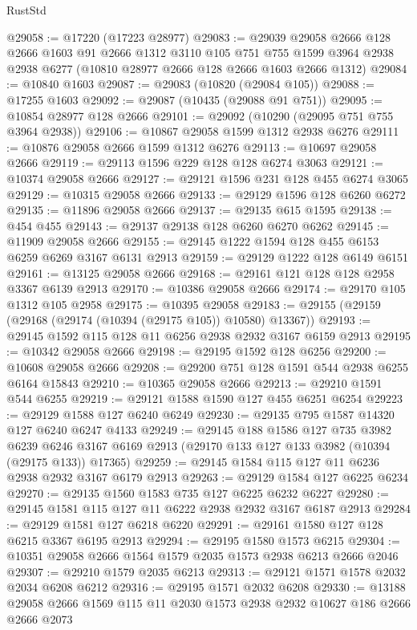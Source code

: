 \begin{lexlean}{RustStd}
\begin{coremodule}
@29058 := @17220 (@17223 @28977)
@29083 := @29039
    @29058
    @2666
    @128
    @2666
    @1603
    @91
    @2666
    @1312
    @3110
    @105
    @751
    @755
    @1599
    @3964
    @2938
    @2938
    @6277
    (@10810 @28977 @2666 @128 @2666 @1603 @2666 @1312)
@29084 := @10840 @1603
@29087 := @29083 (@10820 (@29084 @105))
@29088 := @17255 @1603
@29092 := @29087 (@10435 (@29088 @91 @751))
@29095 := @10854 @28977 @128 @2666
@29101 := @29092 (@10290 (@29095 @751 @755 @3964 @2938))
@29106 := @10867 @29058 @1599 @1312 @2938 @6276
@29111 := @10876 @29058 @2666 @1599 @1312 @6276
@29113 := @10697 @29058 @2666
@29119 := @29113 @1596 @229 @128 @128 @6274 @3063
@29121 := @10374 @29058 @2666
@29127 := @29121 @1596 @231 @128 @455 @6274 @3065
@29129 := @10315 @29058 @2666
@29133 := @29129 @1596 @128 @6260 @6272
@29135 := @11896 @29058 @2666
@29137 := @29135 @615 @1595
@29138 := @454 @455
@29143 := @29137 @29138 @128 @6260 @6270 @6262
@29145 := @11909 @29058 @2666
@29155 := @29145 @1222 @1594 @128 @455 @6153 @6259 @6269 @3167 @6131 @2913
@29159 := @29129 @1222 @128 @6149 @6151
@29161 := @13125 @29058 @2666
@29168 := @29161 @121 @128 @128 @2958 @3367 @6139 @2913
@29170 := @10386 @29058 @2666
@29174 := @29170 @105 @1312 @105 @2958
@29175 := @10395 @29058
@29183 := @29155 (@29159 (@29168 (@29174 (@10394 (@29175 @105)) @10580) @13367))
@29193 := @29145 @1592 @115 @128 @11 @6256 @2938 @2932 @3167 @6159 @2913
@29195 := @10342 @29058 @2666
@29198 := @29195 @1592 @128 @6256
@29200 := @10608 @29058 @2666
@29208 := @29200 @751 @128 @1591 @544 @2938 @6255 @6164 @15843
@29210 := @10365 @29058 @2666
@29213 := @29210 @1591 @544 @6255
@29219 := @29121 @1588 @1590 @127 @455 @6251 @6254
@29223 := @29129 @1588 @127 @6240 @6249
@29230 := @29135 @795 @1587 @14320 @127 @6240 @6247 @4133
@29249 := @29145
    @188
    @1586
    @127
    @735
    @3982
    @6239
    @6246
    @3167
    @6169
    @2913
    (@29170 @133 @127 @133 @3982 (@10394 (@29175 @133)) @17365)
@29259 := @29145 @1584 @115 @127 @11 @6236 @2938 @2932 @3167 @6179 @2913
@29263 := @29129 @1584 @127 @6225 @6234
@29270 := @29135 @1560 @1583 @735 @127 @6225 @6232 @6227
@29280 := @29145 @1581 @115 @127 @11 @6222 @2938 @2932 @3167 @6187 @2913
@29284 := @29129 @1581 @127 @6218 @6220
@29291 := @29161 @1580 @127 @128 @6215 @3367 @6195 @2913
@29294 := @29195 @1580 @1573 @6215
@29304 := @10351 @29058 @2666 @1564 @1579 @2035 @1573 @2938 @6213 @2666 @2046
@29307 := @29210 @1579 @2035 @6213
@29313 := @29121 @1571 @1578 @2032 @2034 @6208 @6212
@29316 := @29195 @1571 @2032 @6208
@29330 := @13188 @29058 @2666 @1569 @115 @11 @2030 @1573 @2938 @2932 @10627 @186 @2666 @2666 @2073

\end{coremodule}
\end{lexlean}
